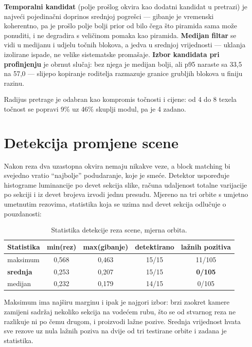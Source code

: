 \documentclass{mathos}
\begin{document}
\textbf{Temporalni kandidat} (polje prošlog okvira kao dodatni kandidat u
pretrazi) je najveći pojedinačni doprinos srednjoj pogrešci — gibanje je
vremenski koherentno, pa je prošlo polje bolji prior od bilo čega što
piramida sama može ponuditi, i ne degradira s veličinom pomaka kao piramida.
\textbf{Medijan filtar} se vidi u medijanu i udjelu točnih blokova, a jedva u
srednjoj vrijednosti — uklanja izolirane ispade, ne velike sistematske
promašaje. \textbf{Izbor kandidata pri profinjenju} je obrnut slučaj: bez
njega je medijan bolji, ali p95 naraste sa 33,5 na 57,0 — slijepo kopiranje
roditelja razmazuje granice grubljih blokova u finiju razinu.

Radijus pretrage je odabran kao kompromis točnosti i cijene: od 4 do 8
texela točnost se popravi 9\% uz 46\% skuplji modul, pa je 4 zadano.

\section{Detekcija promjene scene}

Nakon reza dva uzastopna okvira nemaju nikakve veze, a block matching bi
svejedno vratio ``najbolje'' podudaranje, koje je smeće. Detektor uspoređuje
histograme luminancije po devet sekcija slike, računa udaljenost totalne
varijacije po sekciji i iz devet brojeva izvodi jednu presudu. Mjereno na tri
orbite s umjetno umetnutim rezovima, statistika koja se uzima nad devet
sekcija odlučuje o pouzdanosti:

\begin{table}[hbtp]
\centering
\begin{tabular}{|l|c|c|c|c|}\hline
Statistika & min(rez) & max(gibanje) & detektirano & lažnih pozitiva \\\hline
maksimum & 0,568 & 0,463 & 15/15 & 11/105 \\\hline
\textbf{srednja} & 0,253 & 0,207 & 15/15 & \textbf{0/105} \\\hline
medijan & 0,232 & 0,179 & 14/15 & 0/105 \\\hline
\end{tabular}
\caption{Statistika detekcije reza scene, mjerna orbita.}
\label{table_m6_rez}
\end{table}

Maksimum ima najširu marginu i ipak je najgori izbor: brzi zaokret kamere
zamijeni sadržaj nekoliko sekcija na vodećem rubu, što se od stvarnog reza ne
razlikuje ni po čemu drugom, i proizvodi lažne pozive. Srednja vrijednost
hvata sve rezove uz nula lažnih poziva na dvije od tri testirane orbite i
zadana je statistika.
\end{document}
